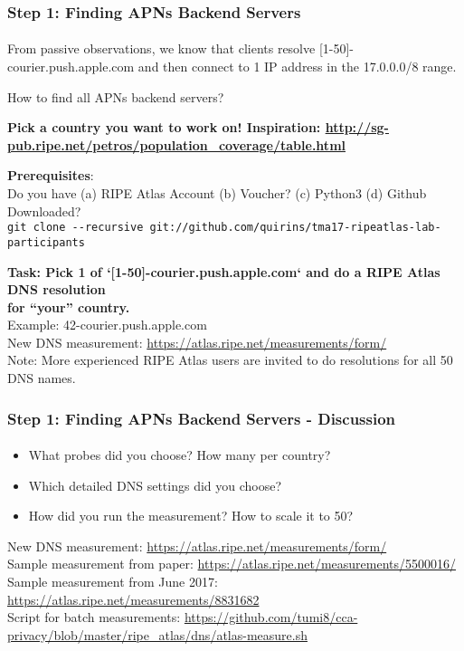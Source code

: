 \begin{frame}
\frametitle{Step 1: Finding APNs Backend Servers}
\framesubtitle{}

From passive observations, we know that clients resolve [1-50]-courier.push.apple.com and then connect to 1 IP address in the 17.0.0.0/8 range.

How to find all APNs backend servers?
\pause

\textbf{Pick a country you want to work on! Inspiration: \url{http://sg-pub.ripe.net/petros/population_coverage/table.html}}
\pause

\textbf{Prerequisites}: \\ 
Do you have (a) RIPE Atlas Account (b) Voucher? (c) Python3 (d) Github Downloaded? \\
\texttt{git clone -{}-recursive git://github.com/quirins/tma17-ripeatlas-lab-participants}

\pause

\textbf{Task: Pick 1 of `[1-50]-courier.push.apple.com` and do a RIPE Atlas DNS resolution \\ for ``your'' country.}\\
Example: 42-courier.push.apple.com \\
New DNS measurement: \url{https://atlas.ripe.net/measurements/form/} \\
Note: More experienced RIPE Atlas users are invited to do resolutions for all 50 DNS names.

\end{frame}
\clearpage
\begin{frame}
\frametitle{Step 1: Finding APNs Backend Servers - Discussion}
\framesubtitle{}
\begin{itemize}
	\item What probes did you choose? How many per country?
	\item Which detailed DNS settings did you choose?
	\item How did you run the measurement? How to scale it to 50?
\end{itemize}
New DNS measurement: \url{https://atlas.ripe.net/measurements/form/} \\
Sample measurement from paper: \url{https://atlas.ripe.net/measurements/5500016/} \\
Sample measurement from June 2017: \url{https://atlas.ripe.net/measurements/8831682} \\
Script for batch measurements: \url{https://github.com/tumi8/cca-privacy/blob/master/ripe\_atlas/dns/atlas-measure.sh} \\

\end{frame}
